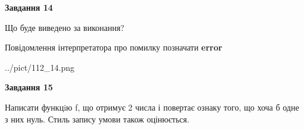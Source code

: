 \documentclass[11pt, ukrainian]{article}
\begin{document}
{\begin {large}
{\begin {center}\textbf{Завдання 14}\end {center}}\par
Що буде виведено за виконання? \par
Повідомлення інтерпретатора про помилку позначати \textbf{error}

\begin{center}
	{../pict/112_14.png}
\end{center}
\newpage

{\begin {center}\textbf{Завдання 15}\end {center}}\par

Написати функцiю f, що отримує 2 числа і повертає ознаку того, що хоча б одне з них нуль. Стиль запису умови також оцінюється.\par
\newpage

\end {large}}
\end{document}
